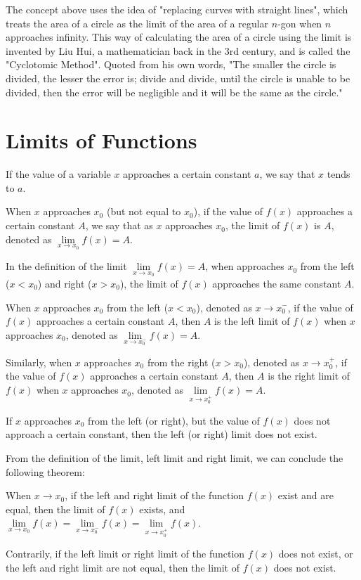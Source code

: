 \documentclass[12pt]{report}
\begin{document}
The concept above uses the idea of "replacing curves with straight lines",
which treats the area of a circle as the limit of the area of a regular $n$-gon
when $n$ approaches infinity. This way of calculating the area of a circle
using the limit is invented by Liu Hui, a mathematician back in the 3rd
century, and is called the "Cyclotomic Method". Quoted from his own words, "The
smaller the circle is divided, the lesser the error is; divide and divide,
until the circle is unable to be divided, then the error will be negligible and
it will be the same as the circle."

\section{Limits of Functions}

If the value of a variable $x$ approaches a certain constant $a$, we say that
$x$ tends to $a$.

When $x$ approaches $x_0$ (but not equal to $x_0$), if the value of $f (x)$
approaches a certain constant $A$, we say that as $x$ approaches $x_0$, the
limit of $f (x)$ is $A$, denoted as $\lim\limits_{x \to x_0} f (x) = A$.

In the definition of the limit $\lim\limits_{x \to x_0} f (x) = A$, when
approaches $x_0$ from the left ($x < x_0$) and right ($x > x_0$), the limit of
$f (x)$ approaches the same constant $A$.

When $x$ approaches $x_0$ from the left ($x < x_0$), denoted as $x \to x_0^-$,
if the value of $f (x)$ approaches a certain constant $A$, then $A$ is the left
limit of $f (x)$ when $x$ approaches $x_0$, denoted as $\lim\limits_{x \to
        x_0^-} f (x) = A$.

Similarly, when $x$ approaches $x_0$ from the right ($x > x_0$), denoted as $x
    \to x_0^+$, if the value of $f (x)$ approaches a certain constant $A$, then $A$
is the right limit of $f (x)$ when $x$ approaches $x_0$, denoted as
$\lim\limits_{x \to x_0^+} f (x) = A$.

If $x$ approaches $x_0$ from the left (or right), but the value of $f (x)$ does
not approach a certain constant, then the left (or right) limit does not exist.

From the definition of the limit, left limit and right limit, we can conclude
the following theorem:
\begin{mdframed}[style=MyFrame]
    When $x \to x_0$, if the left and right limit of the function $f (x)$ exist and are equal, then the limit of $f (x)$ exists, and $\lim\limits_{x \to x_0} f (x) = \lim\limits_{x \to x_0^-} f (x) = \lim\limits_{x \to x_0^+} f (x)$.

    Contrarily, if the left limit or right limit of the function $f (x)$ does not
    exist, or the left and right limit are not equal, then the limit of $f (x)$
    does not exist.
\end{mdframed}
\end{document}
